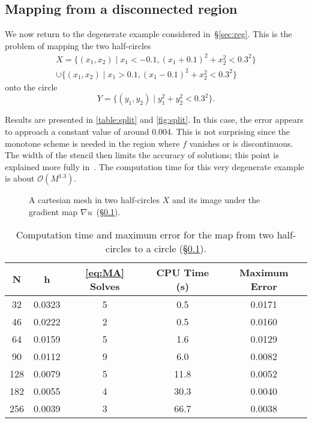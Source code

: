 \documentclass{amsart}
\theoremstyle{lemma}
\theoremstyle{remark}
\begin{document}
\subsection{Mapping from a disconnected region}\label{sec:exSplitCircle}
We now return to the degenerate example considered in~\S\ref{sec:reg}.  This is the problem of mapping the two half-circles
\begin{multline*} X = \{(x_1,x_2)\mid x_1 < -0.1,(x_1+0.1)^2+x_2^2 < 0.3^2 \} \\ \cup \{(x_1,x_2)\mid x_1 > 0.1,(x_1-0.1)^2+x_2^2 < 0.3^2 \}\end{multline*}
onto the circle
\[ Y = \{(y_1,y_2)\mid y_1^2+y_2^2<0.3^2\}.\]

Results are presented in \autoref{table:split} and \autoref{fig:split}.  In this case, the error appears to approach a constant value of around 0.004.  This is not surprising since the monotone scheme is needed in the region where $f$ vanishes or is discontinuous.  The width of the stencil then limits the accuracy of solutions; this point is explained more fully in~\cite{FOTheory}.  The computation time for this very degenerate example is about ${\mathcal{O}}(M^{1.3})$.  

\begin{figure}[htdp]
	\centering
  	\vspace*{-12pt}\caption{ A cartesian mesh in two half-circles $X$ and  its image under the gradient map $\nabla u$~(\S\ref{sec:exSplitCircle}).}
  	\label{fig:split}
\end{figure} 

\begin{table}[htdp]\small
\begin{center}
\begin{tabular}{ccccc}
N  & h & \eqref{eq:MA} Solves & CPU Time (s) & {Maximum Error} \\
\hline
32 & 0.0323 & 5 & 0.5 &  0.0171\\
46 & 0.0222 & 2 & 0.5 &  0.0160\\
64 & 0.0159 &  5 & 1.6 & 0.0129\\
90 & 0.0112 &  9 & 6.0 & 0.0082\\
128 & 0.0079 & 5 & 11.8 & 0.0052\\
182 & 0.0055 & 4 & 30.3 & 0.0040\\
256 & 0.0039 & 3 & 66.7 & 0.0038
\end{tabular}
\end{center}
\caption{Computation time and maximum error for the map from two half-circles to a circle (\S\ref{sec:exSplitCircle}).}
\label{table:split}
\end{table}
\end{document}
